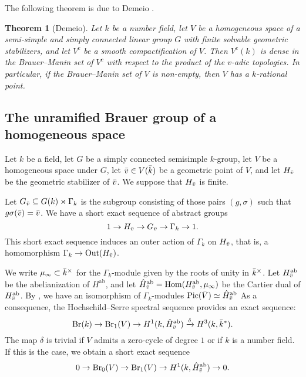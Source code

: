 \documentclass[10pt,letterpaper,twoside]{article}
\renewcommand{\1}{\mathbf{1}}
\newcommand{\Br}{\mathrm{Br}}
\theoremstyle{plain}
\newtheorem{theorem}{Theorem}[section]
\theoremstyle{plain}
\theoremstyle{definition}
\theoremstyle{named}
\theoremstyle{definition}
\begin{document}
The following theorem is due to Demeio \cite{}.

\begin{theorem}[Demeio]
    Let $k$ be a number field, let $V$ be a homogeneous space of a semi-simple and simply connected
    linear group $G$ with finite solvable geometric stabilizers, and let $V^c$ be a smooth
    compactification of $V$. Then $V^c(k)$ is dense in the Brauer–Manin set of $V^c$ with respect to
    the product of the $v$-adic topologies. In particular, if the Brauer--Manin set of $V$ is
    non-empty, then $V$ has a $k$-rational point.
\end{theorem}




\subsection{The unramified Brauer group of a homogeneous space}
	Let $k$ be a field, let $G$ be a simply connected semisimple $k$-group, let $V$ be a homogeneous space under $G$, let $\Bar{v}\in V(\Bar{k})$ be a geometric point of $V$, and let $H_{\Bar{v}}$ be the geometric stabilizer of $\Bar{v}$. We suppose that $H_{\Bar{v}}$ is finite.
	
	Let $G_{\Bar{v}} \subseteq G(k) \rtimes \Gamma_k$ is the subgroup consisting of those pairs $(g, \sigma)$ such that $g\sigma(\Bar{v}) = \Bar{v}$. We have a short exact sequence of abstract groups
	\[
	1 \to H_{\Bar{v}} \to G_{\Bar{v}} \to \Gamma_k \to 1.
	\]
	This short exact sequence induces an outer action of $\Gamma_k$ on $H_{\Bar{v}}$, that is, a homomorphism $\Gamma_k\to \mathrm{Out}(H_{\Bar{v}})$. 
	
	We write $\mu_{\infty}\subset \Bar{k}^\times$ for the $\Gamma_k$-module given by the roots of unity in $\Bar{k}^\times$. Let $H^{\mathrm{ab}}_{\Bar{v}}$ be the abelianization of  $H^{\mathrm{ab}}$, and let $\hat{H}^{\mathrm{ab}}_{\Bar{v}}= \mathrm{Hom}(H^{\mathrm{ab}}_{\Bar{v}}, \mu_{\infty})$ be the Cartier dual of $H^{\mathrm{ab}}_{\Bar{v}}$. By \cite{}, we have an isomorphism of $\Gamma_k$-modules $\text{Pic}(\Bar{V})\simeq \hat{H}^{\mathrm{ab}}_{\Bar{v}}$ As a consequence, the Hochschild–Serre spectral sequence provides an exact sequence:
	\[
	\text{Br}(k) \to \text{Br}_1(V) \to H^1(k, \hat{H}^{\mathrm{ab}}_{\Bar{v}}) \xrightarrow{\delta} H^3(k, \bar{k}^*).
	\]
	The map $\delta$ is trivial if $V$ admits a zero-cycle of degree $1$ or if $k$ is a number field. If this is the case, we obtain a short exact sequence
	\[0\to \Br_0(V)\to \Br_1(V)\to H^1(k, \hat{H}^{\mathrm{ab}}_{\Bar{v}})\to 0.\]
	
\end{document}
